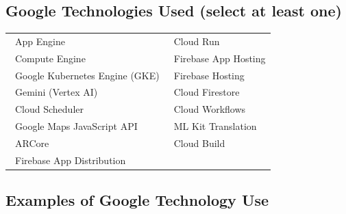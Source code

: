 \documentclass[11pt,a4paper]{article}
\newcommand{\checkedbox}{\makebox[1.2em]{$\boxtimes$}}
\newcommand{\emptybox}{\makebox[1.2em]{$\square$}}
\begin{document}
\subsection{Google Technologies Used (select at least one)}

\noindent
\begin{tabularx}{\textwidth}{@{}YY@{}}
\emptybox~App Engine                  & \checkedbox~Cloud Run \\
\emptybox~Compute Engine              & \emptybox~Firebase App Hosting \\
\emptybox~Google Kubernetes Engine (GKE) & \checkedbox~Firebase Hosting \\
\checkedbox~Gemini (Vertex AI)          & \checkedbox~Cloud Firestore \\
\checkedbox~Cloud Scheduler             & \checkedbox~Cloud Workflows \\
\checkedbox~Google Maps JavaScript API  & \checkedbox~ML Kit Translation \\
\checkedbox~ARCore                      & \checkedbox~Cloud Build \\
\checkedbox~Firebase App Distribution   & \\
\end{tabularx}

\subsection{Examples of Google Technology Use}
\end{document}
